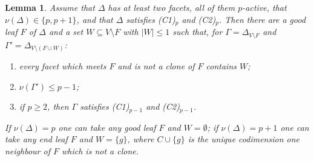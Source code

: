 \documentclass{amsart}
\newtheorem{Lemma}[Theorem]{Lemma}
\theoremstyle{definition}
\theoremstyle{remark}
\begin{document}


\begin{Lemma}\label{lem:choice}
Assume that $\Delta$ has at least two facets, all of them $p$-active, that $\nu(\Delta)\in\{p,p+1\}$, and that $\Delta$ satisfies \textnormal{(C1)$_p$} and \textnormal{(C2)$_p$}. Then there are a good leaf $F$ of $\Delta$ and a set $W\subseteq V\setminus F$ with $|W|\leq 1$ such that, for $\Gamma=\Delta_{V\setminus F}$ and $\Gamma'=\Delta_{V\setminus(F\cup W)}$:
\begin{enumerate}
\item[\textnormal{(i)}] every facet which meets $F$ and is not a clone of $F$ contains $W$;
\item[\textnormal{(ii)}] $\nu(\Gamma')\leq p-1$;
\item[\textnormal{(iii)}] if $p\geq 2$, then $\Gamma$ satisfies \textnormal{(C1)$_{p-1}$} and \textnormal{(C2)$_{p-1}$}.
\end{enumerate}
If $\nu(\Delta)=p$ one can take any good leaf $F$ and $W=\emptyset$; if $\nu(\Delta)=p+1$ one can take any end leaf $F$ and $W=\{g\}$, where $C\cup\{g\}$ is the unique codimension one neighbour of $F$ which is not a clone.
\end{Lemma}
\end{document}
